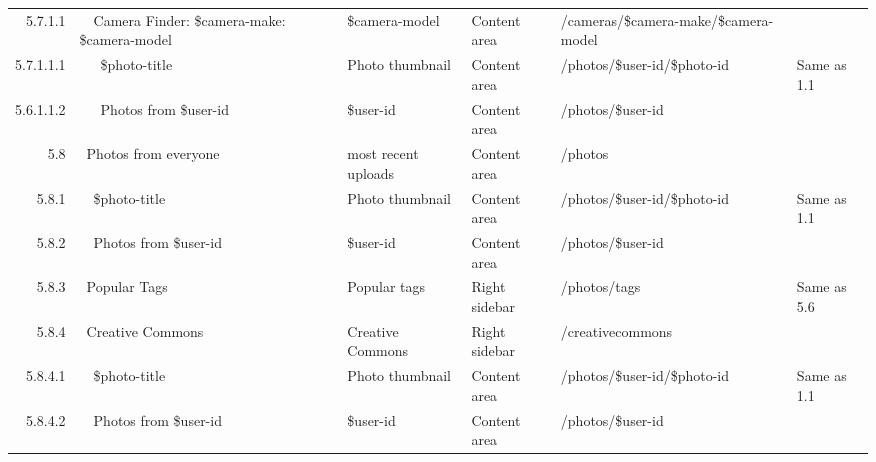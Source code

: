 \documentclass[12pt,a4paper]{article}
\begin{document}
\begin{landscape}
\begin{table}[h!b!p!]
\begin{center}
\begin{tiny}
\begin{tabular}{r|l|l|l|l|p{3cm}}
                  5.7.1.1 &
                  ~~Camera Finder: \$camera-make: \$camera-model &
                  \$camera-model &
                  Content area &
                  /cameras/\$camera-make/\$camera-model &
                  \\

                    5.7.1.1.1 &
                    ~~~\$photo-title &
                    Photo thumbnail &
                    Content area &
                    /photos/\$user-id/\$photo-id &
                    Same as 1.1 \\

                    5.6.1.1.2 &
                    ~~~Photos from \$user-id &
                    \$user-id &
                    Content area &
                    /photos/\$user-id &
                    \\

              5.8 &
              ~Photos from everyone &
              most recent uploads &
              Content area &
              /photos &
              \\

                  5.8.1 &
                  ~~\$photo-title &
                  Photo thumbnail &
                  Content area &
                  /photos/\$user-id/\$photo-id &
                  Same as 1.1 \\

                  5.8.2 &
                  ~~Photos from \$user-id &
                  \$user-id &
                  Content area &
                  /photos/\$user-id &
                  \\


                  5.8.3 &
                  ~Popular Tags &
                  Popular tags &
                  Right sidebar &
                  /photos/tags &
                  Same as 5.6 \\

                  5.8.4 &
                  ~Creative Commons &
                  Creative Commons &
                  Right sidebar &
                  /creativecommons &
                  \\

                    5.8.4.1 &
                    ~~\$photo-title &
                    Photo thumbnail &
                    Content area &
                    /photos/\$user-id/\$photo-id &
                    Same as 1.1 \\

                    5.8.4.2 &
                    ~~Photos from \$user-id &
                    \$user-id &
                    Content area &
                    /photos/\$user-id &
                    \\


\end{tabular}
\end{tiny}
\end{center}
\end{table}
\end{landscape}
\end{document}
